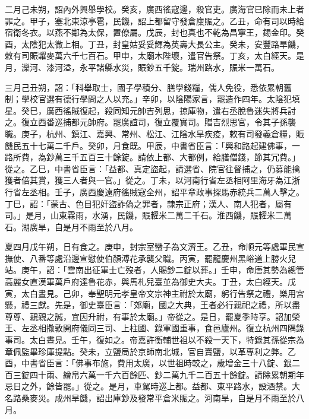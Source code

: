 \begin{pinyinscope}
 二月己未朔，詔內外興舉學校。癸亥，廣西徭寇邊，殺官吏。廣海官已除而未上者罪之。甲子，塞北東涼亭雹，民饑，詔上都留守發倉廩賑之。乙丑，命有司以時給宿衛冬衣。以燕不鄰為太保，置僚屬。戊辰，封也真也不乾為昌寧王，錫金印。癸酉，太陰犯太微上相。丁丑，封皇姑妥妥輝為英壽大長公主。癸未，安豐路旱饑，敕有司賑糶麥萬六千七百石。甲申，太廟木陛壞，遣官告祭。丁亥，太白經天。是月，灤河、漆河溢，永平諸縣水災，賑鈔五千錠。瑞州路水，賑米一萬石。



 三月己丑朔，詔：「科舉取士，國子學積分、膳學錢糧，儒人免役，悉依累朝舊制；學校官選有德行學問之人以充。」辛卯，以陰陽家言，罷造作四年。太陰犯填星。癸巳，廣西徭賊復起，殺同知元帥吉列思，掠庫物，遣右丞脫魯迷失將兵討之。復立西番巡捕都元帥府。罷廣誼司，復立覆實司。贈吉烈思官，令其子孫襲職。庚子，杭州、鎮江、嘉興、常州、松江、江陰水旱疾疫，敕有司發義倉糧，賑饑民五十七萬二千戶。癸卯，月食既。甲辰，中書省臣言：「興和路起建佛事，一路所費，為鈔萬三千五百三十餘錠。請依上都、大都例，給膳僧錢，節其冗費。」從之。乙巳，中書省臣言：「益都、真定盜起，請選省、院官往督捕之，仍募能擒獲者倍其賞，獲三人者與一官。」從之。丁未，以河南行省左丞相阿里海牙為江浙行省左丞相。壬子，廣西慶遠府徭賊寇全州，詔平章政事探馬赤統兵二萬人擊之。丁巳，詔：「蒙古、色目犯奸盜詐偽之罪者，隸宗正府；漢人、南人犯者，屬有司。」是月，山東霖雨，水湧，民饑，賑糶米二萬二千石。淮西饑，賑糶米二萬石。湖廣旱，自是月不雨至於八月。



 夏四月戊午朔，日有食之。庚申，封宗室蠻子為文濟王。乙丑，命順元等處軍民宣撫使、八番等處沿邊宣慰使伯顏溥花承襲父職。丙寅，罷龍慶州黑峪道上勝火兒站。庚午，詔：「雲南出征軍士亡歿者，人賜鈔二錠以葬。」壬申，命唐其勢為總管高麗女直漢軍萬戶府達魯花赤，與馬札兒臺並為御史大夫。丁丑，太白經天。戊寅，太白晝見。己卯，奉聖明元孝皇帝文宗神主祔於太廟，躬行告祭之禮，樂用宮懸，禮三獻。先是，御史臺臣言：「郊廟，國之大典，王者必行親祀之禮，所以盡尊尊、親親之誠，宜因升祔，有事於太廟。」帝從之。是日，罷夏季時享。詔加榮王、左丞相撒敦開府儀同三司、上柱國、錄軍國重事，食邑廬州。復立杭州四隅錄事司。太白晝見。壬午，復如之。帝嘉許衡輔世祖以不殺一天下，特錄其孫從宗為章佩監畢珍庫提點。癸未，立鹽局於京師南北城，官自賣鹽，以革專利之弊。乙酉，中書省臣言：「佛事布施，費用太廣，以世祖時較之，歲增金三十八錠、銀二百三錠四十兩、繒帛六萬一千六百餘匹、鈔二萬九千二百五十餘錠。請除累朝期年忌日之外，餘皆罷。」從之。是月，車駕時巡上都。益都、東平路水，設酒禁。大名路桑麥災。成州旱饑，詔出庫鈔及發常平倉米賑之。河南旱，自是月不雨至於八月。




\end{pinyinscope}
